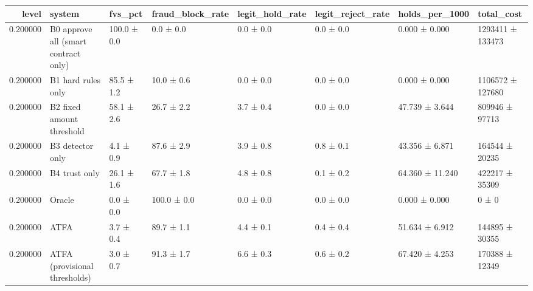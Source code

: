 \begin{tabular}{rlllllll}
\toprule
level & system & fvs\_pct & fraud\_block\_rate & legit\_hold\_rate & legit\_reject\_rate & holds\_per\_1000 & total\_cost \\
\midrule
0.200000 & B0 approve all (smart contract only) & 100.0 ± 0.0 & 0.0 ± 0.0 & 0.0 ± 0.0 & 0.0 ± 0.0 & 0.000 ± 0.000 & 1293411 ± 133473 \\
0.200000 & B1 hard rules only & 85.5 ± 1.2 & 10.0 ± 0.6 & 0.0 ± 0.0 & 0.0 ± 0.0 & 0.000 ± 0.000 & 1106572 ± 127680 \\
0.200000 & B2 fixed amount threshold & 58.1 ± 2.6 & 26.7 ± 2.2 & 3.7 ± 0.4 & 0.0 ± 0.0 & 47.739 ± 3.644 & 809946 ± 97713 \\
0.200000 & B3 detector only & 4.1 ± 0.9 & 87.6 ± 2.9 & 3.9 ± 0.8 & 0.8 ± 0.1 & 43.356 ± 6.871 & 164544 ± 20235 \\
0.200000 & B4 trust only & 26.1 ± 1.6 & 67.7 ± 1.8 & 4.8 ± 0.8 & 0.1 ± 0.2 & 64.360 ± 11.240 & 422217 ± 35309 \\
0.200000 & Oracle & 0.0 ± 0.0 & 100.0 ± 0.0 & 0.0 ± 0.0 & 0.0 ± 0.0 & 0.000 ± 0.000 & 0 ± 0 \\
0.200000 & ATFA & 3.7 ± 0.4 & 89.7 ± 1.1 & 4.4 ± 0.1 & 0.4 ± 0.4 & 51.634 ± 6.912 & 144895 ± 30355 \\
0.200000 & ATFA (provisional thresholds) & 3.0 ± 0.7 & 91.3 ± 1.7 & 6.6 ± 0.3 & 0.6 ± 0.2 & 67.420 ± 4.253 & 170388 ± 12349 \\
\bottomrule
\end{tabular}
